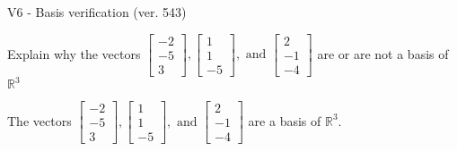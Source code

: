 \begin{exercise}
  \begin{exerciseTitle}V6 - Basis verification (ver. 543)\end{exerciseTitle}
  \begin{exerciseStatement}
    Explain why the vectors \(\left[\begin{array}{r}
-2 \\
-5 \\
3
\end{array}\right] , \left[\begin{array}{r}
1 \\
1 \\
-5
\end{array}\right] , \text{ and } \left[\begin{array}{r}
2 \\
-1 \\
-4
\end{array}\right]\) are or are not a basis of \(\mathbb{R}^3\)	


  \end{exerciseStatement}
  \begin{exerciseAnswer}
   The vectors \(\left[\begin{array}{r}
-2 \\
-5 \\
3
\end{array}\right] , \left[\begin{array}{r}
1 \\
1 \\
-5
\end{array}\right] , \text{ and } \left[\begin{array}{r}
2 \\
-1 \\
-4
\end{array}\right]\) 
  	 are  a basis of \(\mathbb{R}^3\).
  


  \end{exerciseAnswer}
\end{exercise}